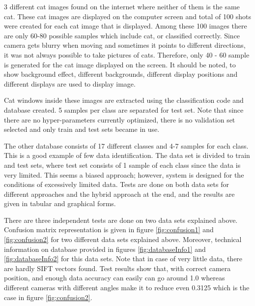 3 different cat images found on the internet where neither of them is the same cat. These cat images are displayed on the computer screen and total of 100 shots were created for each cat image that is displayed. Among these 100 images there are only 60-80 possible samples which include cat, or classified correctly. Since camera gets blurry when moving and sometimes it points to different directions, it was not always possible to take pictures of cats. Therefore, only 40 - 60 sample is generated for the cat image displayed on the screen. It should be noted, to show background effect, different backgrounds, different display positions and different displays are used to display image.


Cat windows inside these images are extracted using the classification code and database created. 5 samples per class are separated for test set. Note that since there are no hyper-parameters currently optimized, there is no validation set selected and only train and test sets became in use.  
 
The other database consists of 17 different classes and 4-7 samples for each class. This is a good example of few data identification. The data set is divided to train and test sets, where test set consists of 1 sample of each class since the data is very limited. This seems a biased approach; however, system is designed for the conditions of excessively limited data. Tests are done on both data sets for different approaches and the hybrid approach at the end, and the results are given in tabular and graphical forms.



There are three independent tests are done on two data sets explained above. Confusion matrix representation is given in figure \ref{fig:confusion1} and \ref{fig:confusion2} for two different data sets explained above. Moreover, technical information on database provided in figures \ref{fig:databaseInfo1} and \ref{fig:databaseInfo2} for this data sets. Note that in case of very little data, there are hardly SIFT vectors found. Test results show that, with correct camera position, and enough data accuracy can easily can go around 1.0 whereas different cameras with different angles make it to reduce even 0.3125 which is the case in figure \ref{fig:confusion2}. 


